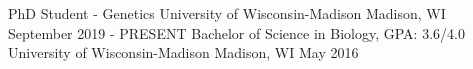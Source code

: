 
\begin{cventries}
  \cventry
    {PhD Student - Genetics} %
    {University of Wisconsin-Madison} %
    {Madison, WI} %
    {September 2019 - PRESENT} %
   \cventry
    {Bachelor of Science in Biology, GPA: 3.6/4.0} %
    {University of Wisconsin-Madison} %
    {Madison, WI} %
    {May 2016} %
\end{cventries}
